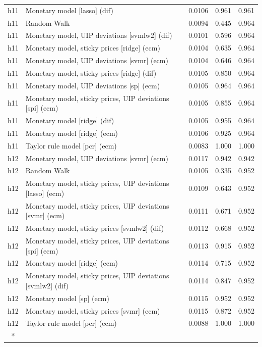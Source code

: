 \begin{ThreePartTable}
\begin{longtable}[t]{cp{5.5cm}ccc}
\addlinespace
h11 & \raggedright Monetary model [lasso] (dif) & 0.0106 & 0.961 & 0.961\\
h11 & \raggedright Random Walk & 0.0094 & 0.445 & 0.964\\
h11 & \raggedright Monetary model, UIP deviations [svmlw2] (dif) & 0.0101 & 0.596 & 0.964\\
h11 & \raggedright Monetary model, sticky prices [ridge] (ecm) & 0.0104 & 0.635 & 0.964\\
h11 & \raggedright Monetary model, UIP deviations [svmr] (ecm) & 0.0104 & 0.646 & 0.964\\
h11 & \raggedright Monetary model, sticky prices [ridge] (dif) & 0.0105 & 0.850 & 0.964\\
h11 & \raggedright Monetary model, UIP deviations [sp] (ecm) & 0.0105 & 0.964 & 0.964\\
h11 & \raggedright Monetary model, sticky prices, UIP deviations [spi] (ecm) & 0.0105 & 0.855 & 0.964\\
h11 & \raggedright Monetary model [ridge] (dif) & 0.0105 & 0.955 & 0.964\\
h11 & \raggedright Monetary model [ridge] (ecm) & 0.0106 & 0.925 & 0.964\\
h11 & \raggedright Taylor rule model [pcr] (ecm) & 0.0083 & 1.000 & 1.000\\
\addlinespace
h12 & \raggedright Monetary model, UIP deviations [svmr] (ecm) & 0.0117 & 0.942 & 0.942\\
h12 & \raggedright Random Walk & 0.0105 & 0.335 & 0.952\\
h12 & \raggedright Monetary model, sticky prices, UIP deviations [lasso] (ecm) & 0.0109 & 0.643 & 0.952\\
h12 & \raggedright Monetary model, sticky prices, UIP deviations [svmr] (ecm) & 0.0111 & 0.671 & 0.952\\
h12 & \raggedright Monetary model, sticky prices [svmlw2] (dif) & 0.0112 & 0.668 & 0.952\\
h12 & \raggedright Monetary model, sticky prices, UIP deviations [spi] (ecm) & 0.0113 & 0.915 & 0.952\\
h12 & \raggedright Monetary model [ridge] (ecm) & 0.0114 & 0.715 & 0.952\\
h12 & \raggedright Monetary model, sticky prices, UIP deviations [svmlw2] (dif) & 0.0114 & 0.847 & 0.952\\
h12 & \raggedright Monetary model [sp] (ecm) & 0.0115 & 0.952 & 0.952\\
h12 & \raggedright Monetary model, sticky prices [svmr] (ecm) & 0.0115 & 0.872 & 0.952\\
h12 & \raggedright Taylor rule model [pcr] (ecm) & 0.0088 & 1.000 & 1.000\\*
\end{longtable}
\end{ThreePartTable}
\endgroup{}
